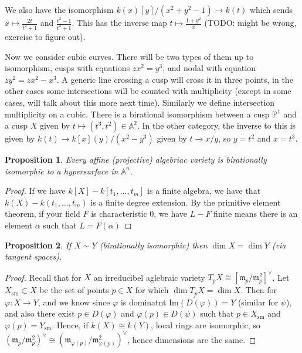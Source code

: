 \documentclass[12pt]{article}
\renewcommand{\P}{\mathbb{P}}
\newcommand{\A}{\mathbb{A}}
\newcommand{\m}{\mathfrak{m}}
\renewcommand{\phi}{\varphi}
\newtheorem{proposition}{Proposition}[section]
\begin{document}
    We also have the isomorphism $k(x)[y]/(x^2 + y^2 - 1) \to k(t)$ which sends $x \mapsto \frac{2t}{t^2 + 1}$ and $\frac{t^2 - 1}{t^2 + 1}$. This has the inverse map $t \mapsto \frac{1 + y^2}{x}$ (TODO: might be wrong, exercise to figure out). \par
    \hfill \par
    Now we consider cubic curves. There will be two types of them up to isomorphism, cusps with equations $zx^2 = y^3$, and nodal with equation $zy^2 = zx^2 - x^3$. A generic line crossing a cusp will cross it in three points, in the other cases some intersections will be counted with multiplicity (except in some cases, will talk about this more next time). Similarly we define intersection multiplicity on a cubic. There is a birational isomorphism between a cusp $\P^1$ and a cusp $X$ given by $t \mapsto (t^3, t^2) \in \A^2$. In the other category, the inverse to this is given by $k(t) \to k[x](y)/(x^2 - y^3)$ given by $t \to x/y$, so $y = t^2$ and $x = t^3$. \par
    \begin{proposition}
        Every affine (projective) algebriac variety is birationally isomorphic to a hypersurface in $\A^n$.
    \end{proposition}
    \begin{proof}
        If we have $k[X] - k[t_1, \dots, t_m]$ is a finite algebra, we have that $k(X) - k(t_1, \dots, t_m)$ is a finite degree extension. By the primitive element theorem, if your field $F$ is characteristic $0$, we have $L - F$ finite means there is an element $\alpha$ such that $L = F(\alpha)$
    \end{proof}
    \begin{proposition}
        If $X \sim Y$ (birationally isomorphic) then $\dim X = \dim Y$ (via tangent spaces).
    \end{proposition}
    \begin{proof}
        Recall that for $X$ an irreducibel aglebraic variety $T_pX \cong [\m_p/\m_p^2]^\vee$. Let $X_{\mathrm{sm}} \subset X$ be the set of points $p \in X$ for which $\dim T_pX = \dim X$. Then for $\phi:X \to Y$, and we know since $\phi$ is dominatnt $\overline{\mathrm{Im}(D(\phi))} = Y$ (similar for $\psi$), and also there exist $p \in D(\phi)$ and $\phi(p) \in D(\psi)$ such that $p \in X_{\mathrm{sm}}$ and $\phi(p) = Y_{\mathrm{sm}}$. Hence, if $k(X) \cong k(Y)$, local rings are isomorphic, so $(\m_p/\m_p^2)^\vee \cong (\m_{\phi(p)}/\m_{\phi(p)}^2)^\vee$, hence dimensions are the same.
    \end{proof}
\end{document}
